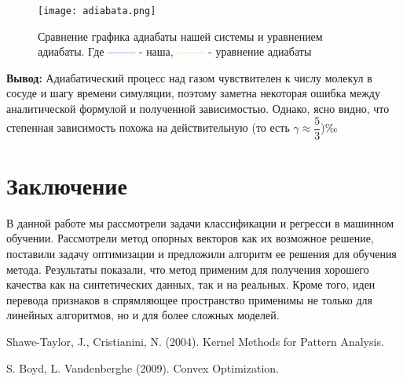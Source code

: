 \documentclass[twoside,twocolumn]{article}
\theoremstyle{plain}
\theoremstyle{definition}
\begin{document}
\begin{figure}[!h]
{\texttt{[image: adiabata.png]}}
\caption{Сравнение графика адиабаты нашей системы и уравнением адиабаты. \hspace{30ex}
Где \textcolor{blue}{--------} - наша, \textcolor{Orange}{--------} - уравнение адиабаты}
\end{figure}


\textbf{Вывод:}
Адиабатический процесс над газом чувствителен к числу молекул в сосуде и шагу времени симуляции, поэтому заметна некоторая
ошибка между аналитической формулой и полученной зависимостью. Однако, ясно видно, что степенная зависимость
похожа на действительную (то есть $\gamma \approx \dfrac{5}{3}$)‰

\section{Заключение}
В данной работе мы рассмотрели задачи классификации и регресси в машинном обучении. Рассмотрели метод опорных векторов как их возможное решение, поставили задачу
оптимизации и предложили алгоритм ее решения для обучения метода. Результаты показали, что метод применим для получения хорошего качества как на синтетических
данных, так и на реальных. Кроме того, идеи перевода признаков в спрямляющее пространство применимы не только для линейных алгоритмов, но и для более сложных
моделей.



\begin{thebibliography}{99} %

Shawe-Taylor, J., Cristianini, N. (2004).
\newblock Kernel Methods for Pattern Analysis.

S. Boyd, L. Vandenberghe (2009).
\newblock Convex Optimization.

\end{thebibliography}

\end{document}

